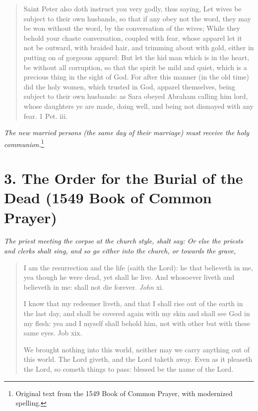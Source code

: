 \documentclass[
]{book}
\begin{document}
\begin{quote}
Saint Peter also doth instruct you very godly, thus saying, Let wives be subject to their own husbands, so that if any obey not the word, they may be won without the word, by the conversation of the wives; While they behold your chaste conversation, coupled with fear, whose apparel let it not be outward, with braided hair, and trimming about with gold, either in putting on of gorgeous apparel: But let the hid man which is in the heart, be without all corruption, so that the spirit be mild and quiet, which is a precious thing in the sight of God. For after this manner (in the old time) did the holy women, which trusted in God, apparel themselves, being subject to their own husbands: as Sara obeyed Abraham calling him lord, whose daughters ye are made, doing well, and being not dismayed with any fear. 1 Pet. iii.
\end{quote}

\emph{The new married persons (the same day of their marriage) must receive the holy communion.}\footnote{Original text from the 1549 Book of Common Prayer, with modernized spelling.}

\protect\hypertarget{chapter-slug-3-the-order-for-the-burial-of-the-dead-1549-book-of-common-prayer}{\href{}{}}

\hypertarget{the-order-for-the-burial-of-the-dead-1549-book-of-common-prayer}{%
\section*{3. The Order for the Burial of the Dead (1549 Book of Common Prayer)}\label{the-order-for-the-burial-of-the-dead-1549-book-of-common-prayer}}

\protect\hypertarget{appendix2.3}{\href{}{}}\emph{The priest meeting the corpse at the church style, shalt say: Or else the priests and clerks shalt sing, and so go either into the church, or towards the grave,}

\begin{quote}
I am the resurrection and the life (saith the Lord): he that believeth in me, yea though he were dead, yet shall he live. And whosoever liveth and believeth in me: shall not die forever. \emph{John} xi.

I know that my redeemer liveth, and that I shall rise out of the earth in the last day, and shall be covered again with my skin and shall see God in my flesh: yea and I myself shall behold him, not with other but with these same eyes. Job xix.

We brought nothing into this world, neither may we carry anything out of this world. The Lord giveth, and the Lord taketh away. Even as it pleaseth the Lord, so cometh things to pass: blessed be the name of the Lord.
\end{quote}
\end{document}
